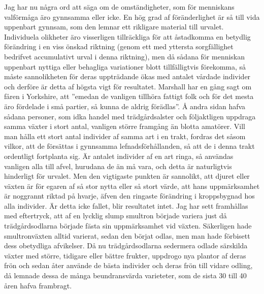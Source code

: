 Jag har nu några ord att säga om de omständigheter, som för menniskans valförmåga äro gynnsamma eller icke. En hög grad af föränderlighet är så till vida uppenbart gynnsam, som den lemnar ett rikligare material till urvalet. Individuela olikheter äro visserligen tillräckliga för att åstadkomma en betydlig förändring i en viss önskad riktning (genom ett med yttersta sorgfällighet bedrifvet accumulativt urval i denna riktning), men då sådana för menniskan uppenbart nyttiga eller behagliga variationer blott tillfälligtvis förekomma, så måste sannolikheten för deras uppträdande ökas med antalet vårdade individer och derföre är detta af högsta vigt för resultatet. Marshall har en gång sagt om fåren i Yorkshire, att ”emedan de vanligen tillhöra fattigt folk och för det mesta äro fördelade i små partier, så kunna de aldrig förädlas”. Å andra sidan hafva sådana personer, som idka handel med trädgårdsalster och följaktligen uppdraga samma växter i stort antal, vanligen större framgång än blotta amatörer. Vill man hålla ett stort antal individer af samma art i en trakt, fordras det såsom vilkor, att de försättas i gynnsamma lefnadsförhållanden, så att de i denna trakt ordentligt fortplanta sig. Är antalet individer af en art ringa, så användas vanligen alla till afvel, hurudana de än må vara, och detta är naturligtvis hinderligt för urvalet. Men den vigtigaste punkten är sannolikt, att djuret eller växten är för egaren af så stor nytta eller så stort värde, att hans uppmärksamhet är noggrannt riktad på hvarje, äfven den ringaste förändring i kroppsbygnad hos alla individer. Är detta icke fallet, blir resultatet intet. Jag har sett framhållas med eftertryck, att af en lycklig slump smultron började variera just då trädgårdsodlarna började fästa sin uppmärksamhet vid växten. Säkerligen hade smultronväxten alltid varierat, sedan den börjat odlas, men man hade förbisett dess obetydliga afvikelser. Då nu trädgårdsodlarna sedermera odlade särskilda växter med större, tidigare eller bättre frukter, uppdrogo nya plantor af deras frön och sedan åter använde de bästa individer och deras frön till vidare odling, då lemnade dessa de många beundransvärda varieteter, som de sista 30 till 40 åren hafva frambragt.

